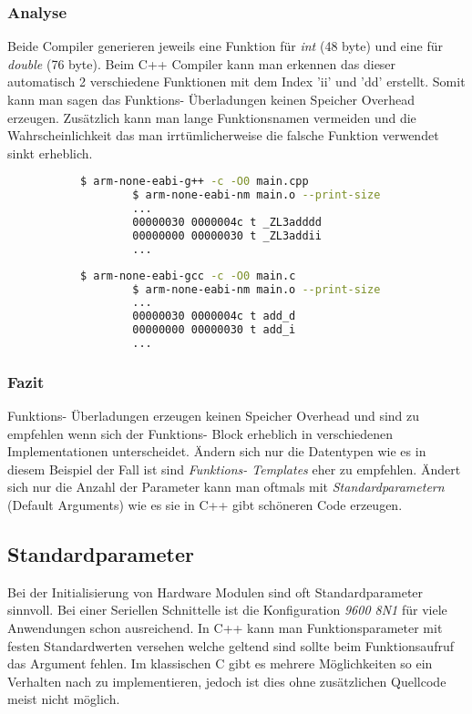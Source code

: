 \documentclass[MES,Master,ngerman]{twbook}%
\begin{document}
\subsubsection{Analyse}
Beide Compiler generieren jeweils eine Funktion für \textit{int} (48 byte) und eine für \textit{double} (76 byte). Beim C++ Compiler kann man erkennen das dieser automatisch 2 verschiedene Funktionen mit dem Index 'ii' und 'dd' erstellt. Somit kann man sagen das Funktions- Überladungen keinen Speicher Overhead erzeugen. Zusätzlich kann man lange Funktionsnamen vermeiden und die Wahrscheinlichkeit das man irrtümlicherweise die falsche Funktion verwendet sinkt erheblich.
\begin{figure}[!htb]
	\begin{subfigure}[b]{0.5\textwidth}
		\begin{lstlisting}[gobble=6, title={Analyse C++}, language=bash, numbers=none]
		$ arm-none-eabi-g++ -c -O0 main.cpp
		$ arm-none-eabi-nm main.o --print-size
		...
		00000030 0000004c t _ZL3adddd
		00000000 00000030 t _ZL3addii
		...
		\end{lstlisting}
	\end{subfigure}
	\begin{subfigure}[b]{0.5\textwidth}
		\begin{lstlisting}[gobble=6, title={Analyse C}, language=bash, numbers=none]
		$ arm-none-eabi-gcc -c -O0 main.c
		$ arm-none-eabi-nm main.o --print-size
		...
		00000030 0000004c t add_d
		00000000 00000030 t add_i
		...
		\end{lstlisting}
	\end{subfigure}
\end{figure}

\subsubsection{Fazit}
Funktions- Überladungen erzeugen keinen Speicher Overhead und sind zu empfehlen wenn sich der Funktions- Block erheblich in verschiedenen Implementationen unterscheidet. Ändern sich nur die Datentypen wie es in diesem Beispiel der Fall ist sind \textit{Funktions- Templates} eher zu empfehlen. Ändert sich nur die Anzahl der Parameter kann man oftmals mit \textit{Standardparametern} (Default Arguments) wie es sie in C++ gibt schöneren Code erzeugen.

\newpage
\subsection{Standardparameter}
Bei der Initialisierung von Hardware Modulen sind oft Standardparameter sinnvoll. Bei einer Seriellen Schnittelle ist die Konfiguration \textit{9600 8N1} für viele Anwendungen schon ausreichend. In C++ kann man Funktionsparameter mit festen Standardwerten versehen welche geltend sind sollte beim Funktionsaufruf das Argument fehlen. Im klassischen C gibt es mehrere Möglichkeiten so ein Verhalten nach zu implementieren, jedoch ist dies ohne zusätzlichen Quellcode meist nicht möglich.
\end{document}
